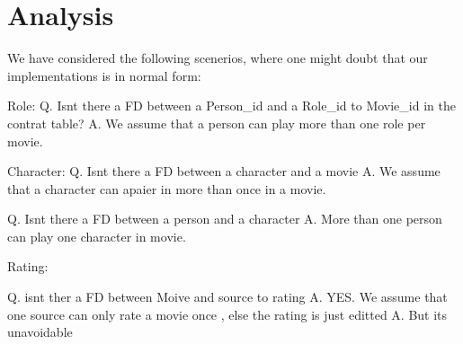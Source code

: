 \section{Analysis}

We have considered the following scenerios, where one might doubt that our implementations is in normal form:

Role:
Q. Isnt there a FD between a Person_id and a Role_id to Movie_id in the contrat table? 
A. We assume that a person can play more than one role per movie.


Character:
Q. Isnt there a FD between a character and a movie 
A. We assume that a character can apaier in more than once in a movie.

Q. Isnt there a FD between a person and a character
A. More than one person can play one character in movie.


Rating:

Q. isnt ther a FD between Moive and source to rating
A. YES. We assume that one source can only rate a movie once , else the rating is just editted
A. But its unavoidable

\newpage


